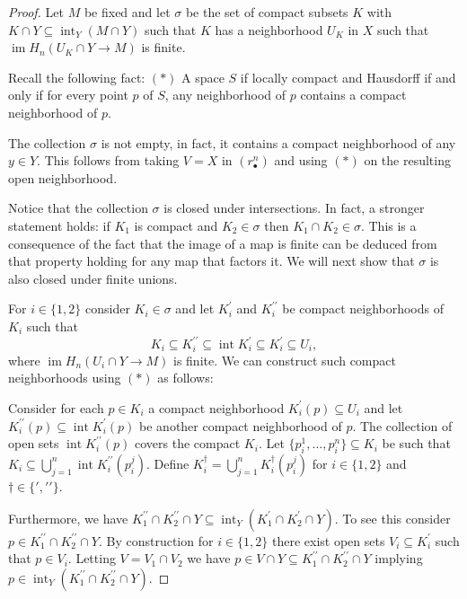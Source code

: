 \documentclass{amsart}
\newcommand{\dprime}{{\prime\prime}}
\DeclareMathOperator{\im}{im}
\DeclareMathOperator{\interior}{int}
\begin{document}
	\begin{proof}
		Let $M$ be fixed and let $\sigma$ be the set of compact subsets $K$ with $K \cap Y \subseteq \interior_Y(M \cap Y)$ such that $K$ has a neighborhood $U_K$ in $X$ such that $\im H_n\left(U_K \cap Y \to M\right)$ is finite.
		
		Recall the following fact:
		$(\ast)$ A space $S$ if locally compact and Hausdorff if and only if for every point $p$ of $S$, any neighborhood of $p$ contains a compact neighborhood of $p$.
		
		The collection $\sigma$ is not empty, in fact, it contains a compact neighborhood of any $y \in Y$. This follows from taking $V = X$ in $(r_\bullet^n)$ and using $(\ast)$ on the resulting open neighborhood.
		
		Notice that the collection $\sigma$ is closed under intersections. In fact, a stronger statement holds: if $K_1$ is compact and $K_2 \in \sigma$ then $K_1 \cap K_2 \in \sigma$. This is a consequence of the fact that the image of a map is finite can be deduced from that property holding for any map that factors it. We will next show that $\sigma$ is also closed under finite unions.
		
		For $i \in \{1, 2\}$ consider $K_i \in \sigma$ and let $K_i^\prime$ and $K_i^\dprime$ be compact neighborhoods of $K_i$ such that
		\begin{equation*}
		K_i \subseteq K_i^\dprime \subseteq \interior K_i^\prime \subseteq K_i^\prime \subseteq U_i,
		\end{equation*}
		where $\im H_n\left(U_i \cap Y \to M\right)$ is finite. 
		We can construct such compact neighborhoods using $(\ast)$ as follows:
		
		Consider for each $p \in K_i$ a compact neighborhood $K^\prime_i(p) \subseteq U_i$ and let $K_i^\dprime(p) \subseteq \interior K_i^\prime(p)$ be another compact neighborhood of $p$. The collection of open sets $\interior K_i^\dprime(p)$ covers the compact $K_i$. Let $\{p_i^{1}, \dots, p^{n}_i\} \subseteq K_i$ be such that $K_i \subseteq \bigcup_{j=1}^n \interior K^\dprime_i(p^j_i)$. Define $K_i^\dag = \bigcup_{j=1}^n K^\dag_i(p^j_i)$ for $i \in \{1,2\}$ and $\dag \in \{\prime, \dprime\}$.
		
		Furthermore, we have $K^\dprime_1 \cap K^\dprime_2 \cap Y \subseteq \interior_Y(K_1^\prime \cap K_2^\prime \cap Y)$. To see this consider $p \in K^\dprime_1 \cap K^\dprime_2 \cap Y$. By construction for $i \in \{1, 2\}$ there exist open sets $V_i \subseteq K_i^\prime$ such that $p \in V_i$. Letting $V = V_1 \cap V_2$ we have $p \in V \cap Y \subseteq K^\dprime_1 \cap K^\dprime_2 \cap Y$ implying $p \in \interior_Y(K^\dprime_1 \cap K^\dprime_2 \cap Y)$.
		

\end{proof}
\end{document}
